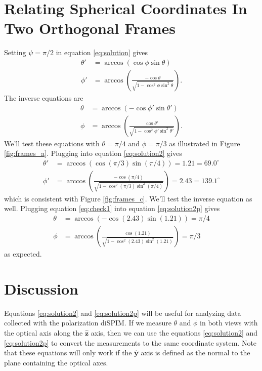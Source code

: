\documentclass[11pt]{article}
\providecommand{\mh}[1]{\mathbf{\hat{#1}}}
\begin{document}
\section{Relating Spherical Coordinates In Two Orthogonal Frames}
Setting $\psi = \pi/2$ in equation \ref{eq:solution} gives
\begin{subequations}
  \begin{align}
  \theta' &= \arccos\left(\cos\phi\sin\theta\right)\\
  \phi' &= \arccos\left(\frac{-\cos\theta}{\sqrt{1 - \cos^2\phi\sin^2\theta}}\right).
\end{align} \label{eq:solution2}%
\end{subequations}
The inverse equations are
\begin{subequations}
\begin{align}
  \theta &= \arccos\left(-\cos\phi'\sin\theta'\right)\\
  \phi &= \arccos\left(\frac{\cos\theta'}{\sqrt{1 - \cos^2\phi'\sin^2\theta'}}\right).
\end{align} \label{eq:solution2p}%
\end{subequations}
We'll test these equations with $\theta = \pi/4$ and $\phi=\pi/3$ as illustrated in
Figure \ref{fig:frames_a}. Plugging into equation \ref{eq:solution2} gives
\begin{subequations}
\begin{align}
  \theta' &= \arccos\left(\cos(\pi/3)\sin(\pi/4)\right) = 1.21 = 69.0^{\circ}\\
  \phi' &= \arccos\left(\frac{-\cos(\pi/4)}{\sqrt{1 - \cos^2(\pi/3)\sin^2(\pi/4)}}\right) = 2.43 = 139.1^{\circ}
\end{align}\label{eq:check1}%
\end{subequations}
which is consistent with Figure \ref{fig:frames_c}. We'll test the inverse equation as
well. Plugging equation \ref{eq:check1} into equation \ref{eq:solution2p} gives
\begin{subequations}
\begin{align}
  \theta &= \arccos\left(-\cos(2.43)\sin(1.21)\right) = \pi/4\\
  \phi &= \arccos\left(\frac{\cos(1.21)}{\sqrt{1 - \cos^2(2.43)\sin^2(1.21)}}\right) = \pi/3
\end{align}\label{eq:check1}%
\end{subequations}
as expected. 


\section{Discussion}
Equations \ref{eq:solution2} and \ref{eq:solution2p} will be useful for
analyzing data collected with the polarization diSPIM. If we measure $\theta$
and $\phi$ in both views with the optical axis along the $\mh{z}$ axis, then we
can use the equations \ref{eq:solution2} and \ref{eq:solution2p} to convert the
measurements to the same coordinate system. Note that these equations will only
work if the $\mh{y}$ axis is defined as the normal to the plane containing the
optical axes.
\end{document}
